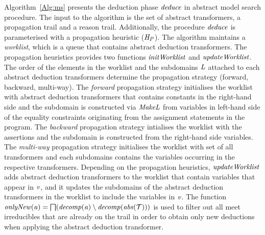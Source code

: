 Algorithm~\ref{Alg:ms} presents the deduction phase $\mathit{deduce}$ in 
abstract model search procedure.  The input to the algorithm is 
the set of abstract transformers, a propagation trail and a reason 
trail.  Additionally, the procedure $\mathit{deduce}$ is parameterised with 
a propagation heuristic ($\mathit{H_P}$). 
%
The algorithm maintains a  {\em worklist}, which is a queue that contains 
abstract deduction transformers.  The propagation heuristics provides two 
functions $\mathit{initWorklist}$ and $\mathit{updateWorklist}$.
The order of the elements in the worklist and the subdomains $\mathit{L}$
attached  to each abstract deduction transformers 
\rmcmt{($\abstransel{\subdomain}$)} determine the propagation strategy 
(forward, backward, multi-way).
%
The {\em forward} propagation strategy initialises the worklist with
abstract deduction transformers that contains constants in the
right-hand side and the subdomain is constructed via $\mathit{MakeL}$
from variables in left-hand side of the equality constraints
originating from the assignment statements in the program.
%
The {\em backward} propagation strategy intialises the worklist 
with the assertions and the subdomain is constructed from the 
right-hand side variables.
%
The {\em multi-way} propagation strategy initialises the worklist 
with set of all transformers and each  
subdomains contains the variables occurring in the respective transformers.
%
Depending on the propagation heuristics, $\mathit{updateWorklist}$ adds
abstract deduction transformers to the worklist that contain variables
that appear in $\mathit{v}$, and it updates the subdomains of
the abstract deduction transformers in the worklist 
to include the variables in $\mathit{v}$.
%
The function
$\mathit{onlyNew}(\mathit{a})=\bigsqcap({\mathit{decomp}}(\mathit{a})\setminus{\mathit{decomp}}(\mathit{abs}(\mathcal{T})))$
is used to filter out all meet irreducibles that are already on the trail
in order to obtain only new deductions when applying the abstract deduction transformer.
%
  
